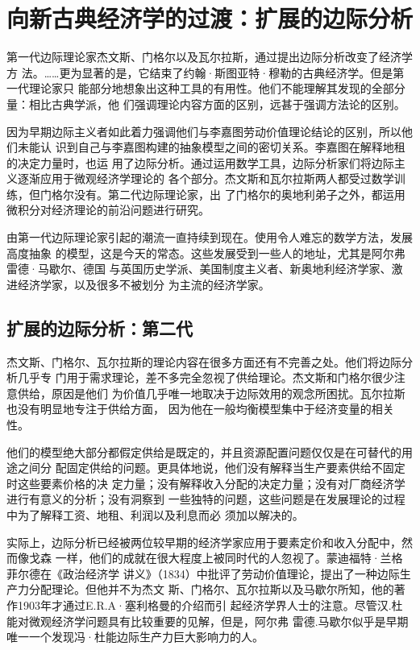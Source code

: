 \chapter{向新古典经济学的过渡：扩展的边际分析}

第一代边际理论家杰文斯、门格尔以及瓦尔拉斯，通过提出边际分析改变了经济学方
法。……更为显著的是，它结束了约翰·斯图亚特·穆勒的古典经济学。但是第一代理论家只
能部分地想象出这种工具的有用性。他们不能理解其发现的全部分量：相比古典学派，他
们强调理论内容方面的区别，远甚于强调方法论的区别。

因为早期边际主义者如此着力强调他们与李嘉图劳动价值理论结论的区别，所以他们未能认
识到自己与李嘉图构建的抽象模型之间的密切关系。李嘉图在解释地租的决定力量时，也运
用了边际分析。通过运用数学工具，边际分析家们将边际主义逐渐应用于微观经济学理论的
各个部分。杰文斯和瓦尔拉斯两人都受过数学训练，但门格尔没有。第二代边际理论家，出
了门格尔的奥地利弟子之外，都运用微积分对经济理论的前沿问题进行研究。

由第一代边际理论家引起的潮流一直持续到现在。使用令人难忘的数学方法，发展高度抽象
的模型，这是今天的常态。这些发展受到一些人的地址，尤其是阿尔弗雷德·马歇尔、德国
与英国历史学派、美国制度主义者、新奥地利经济学家、激进经济学家，以及很多不被划分
为主流的经济学家。

\section{扩展的边际分析：第二代}

杰文斯、门格尔、瓦尔拉斯的理论内容在很多方面还有不完善之处。他们将边际分析几乎专
门用于需求理论，差不多完全忽视了供给理论。杰文斯和门格尔很少注意供给，原因是他们
为价值几乎唯一地取决于边际效用的观念所困扰。瓦尔拉斯也没有明显地专注于供给方面，
因为他在一般均衡模型集中于经济变量的相关性。

他们的模型绝大部分都假定供给是既定的，并且资源配置问题仅仅是在可替代的用途之间分
配固定供给的问题。更具体地说，他们没有解释当生产要素供给不固定时这些要素价格的决
定力量；没有解释收入分配的决定力量；没有对厂商经济学进行有意义的分析；没有洞察到
一些独特的问题，这些问题是在发展理论的过程中为了解释工资、地租、利润以及利息而必
须加以解决的。

实际上，边际分析已经被两位较早期的经济学家应用于要素定价和收入分配中，然而像戈森
一样，他们的成就在很大程度上被同时代的人忽视了。蒙迪福特·兰格菲尔德在《政治经济学
讲义》（1834）中批评了劳动价值理论，提出了一种边际生产力分配理论。但他并不为杰文
斯、门格尔、瓦尔拉斯以及马歇尔所知，他的著作1903年才通过E.R.A·塞利格曼的介绍而引
起经济学界人士的注意。尽管汉.杜能对微观经济学问题具有比较重要的见解，但是，阿尔弗
雷德.马歇尔似乎是早期唯一一个发现冯·杜能边际生产力巨大影响力的人。

